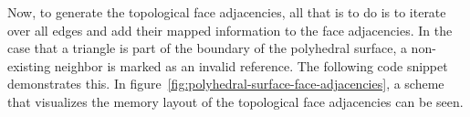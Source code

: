 \documentclass{stdlocal}
\begin{document}
  Now, to generate the topological face adjacencies, all that is to do is to iterate over all edges and add their mapped information to the face adjacencies.
  In the case that a triangle is part of the boundary of the polyhedral surface, a non-existing neighbor is marked as an invalid reference.
  The following code snippet demonstrates this.
  In figure~\ref{fig:polyhedral-surface-face-adjacencies}, a scheme that visualizes the memory layout of the topological face adjacencies can be seen.
\end{document}
